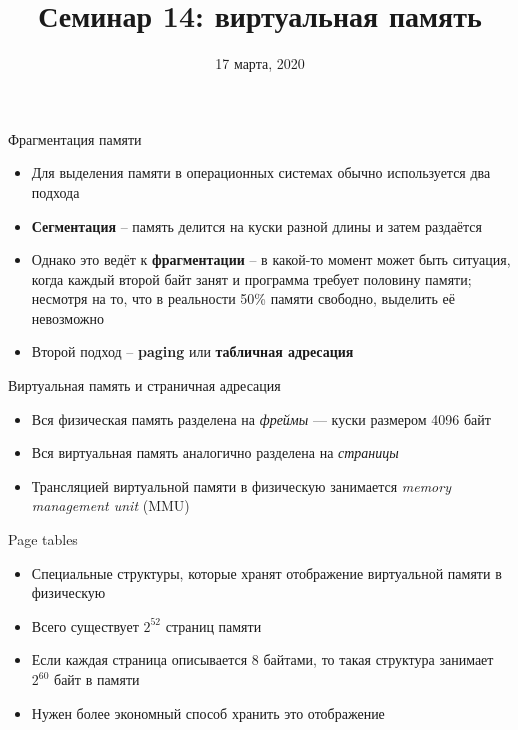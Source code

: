 \documentclass[10pt,pdf,hyperref={unicode}]{beamer}
\title{Семинар 14: виртуальная память}
\date{17 марта, 2020}
\begin{document}
\begin{frame}
  \titlepage
\end{frame}

\begin{frame}{Фрагментация памяти}
\begin{itemize}
    \item Для выделения памяти в операционных системах обычно используется два подхода
    \item \textbf{Сегментация} -- память делится на куски разной длины и затем раздаётся
    \item Однако это ведёт к \textbf{фрагментации} -- в какой-то момент может быть ситуация, когда каждый второй байт занят и программа требует половину памяти; несмотря на то, что в реальности 50\% памяти свободно, выделить её невозможно
    \item Второй подход -- \textbf{paging} или \textbf{табличная адресация}
\end{itemize}
\end{frame}

\begin{frame}{Виртуальная память и страничная адресация}
\begin{itemize}
    \item Вся физическая память разделена на \emph{фреймы} — куски размером 4096 байт
    \item Вся виртуальная память аналогично разделена на \emph{страницы}
    \item Трансляцией виртуальной памяти в физическую занимается \emph{memory management unit} (MMU)
\end{itemize}
\end{frame}

\begin{frame}{Page tables}
\begin{itemize}
    \item Специальные структуры, которые хранят отображение виртуальной памяти в физическую
    \item Всего существует $2^{52}$ страниц памяти
    \item Если каждая страница описывается 8 байтами, то такая структура занимает $2^{60}$ байт в памяти
    \item Нужен более экономный способ хранить это отображение
\end{itemize}
\end{frame}
\end{document}
